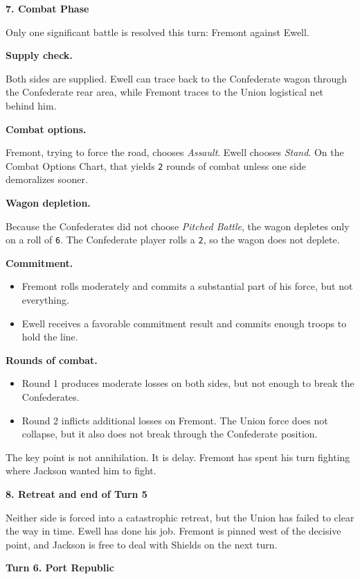 \documentclass[11pt]{article}
\begin{document}
\textbf{7. Combat Phase}

Only one significant battle is resolved this turn: Fremont against Ewell.

\textbf{Supply check.}

Both sides are supplied. Ewell can trace back to the Confederate wagon through the Confederate rear area, while Fremont traces to the Union logistical net behind him.

\textbf{Combat options.}

Fremont, trying to force the road, chooses \textit{Assault}. Ewell chooses \textit{Stand}. On the Combat Options Chart, that yields \texttt{2} rounds of combat unless one side demoralizes sooner.

\textbf{Wagon depletion.}

Because the Confederates did not choose \textit{Pitched Battle}, the wagon depletes only on a roll of \texttt{6}. The Confederate player rolls a \texttt{2}, so the wagon does not deplete.

\textbf{Commitment.}

\begin{itemize}
\item Fremont rolls moderately and commits a substantial part of his force, but not everything.
\item Ewell receives a favorable commitment result and commits enough troops to hold the line.
\end{itemize}

\textbf{Rounds of combat.}

\begin{itemize}
\item Round 1 produces moderate losses on both sides, but not enough to break the Confederates.
\item Round 2 inflicts additional losses on Fremont. The Union force does not collapse, but it also does not break through the Confederate position.
\end{itemize}

The key point is not annihilation. It is delay. Fremont has spent his turn fighting where Jackson wanted him to fight.

\textbf{8. Retreat and end of Turn 5}

Neither side is forced into a catastrophic retreat, but the Union has failed to clear the way in time. Ewell has done his job. Fremont is pinned west of the decisive point, and Jackson is free to deal with Shields on the next turn.

\textbf{Turn 6. Port Republic}
\end{document}
